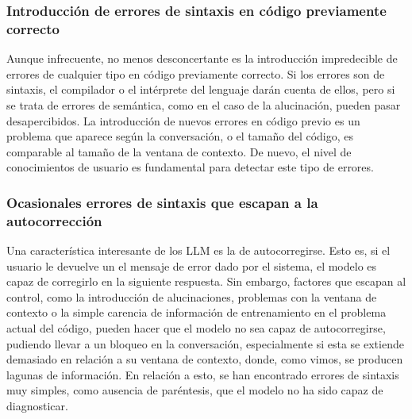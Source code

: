 \subsubsection{Introducción de errores de sintaxis en código previamente correcto}
Aunque infrecuente, no menos desconcertante es la introducción impredecible de errores de cualquier tipo en código previamente correcto. Si los errores son de sintaxis, el compilador o el intérprete del lenguaje darán cuenta de ellos, pero si se trata de errores de semántica, como en el caso de la alucinación, pueden pasar desapercibidos. La introducción de nuevos errores en código previo es un problema que aparece según la conversación, o el tamaño del código, es comparable al tamaño de la ventana de contexto. De nuevo, el nivel de conocimientos de usuario es fundamental para detectar este tipo de errores.


\subsubsection{Ocasionales errores de sintaxis que escapan a la autocorrección}
Una característica interesante de los LLM es la de autocorregirse. Esto es, si el usuario le devuelve un el mensaje de error dado por el sistema, el modelo es capaz de corregirlo en la siguiente respuesta. Sin embargo, factores que escapan al control, como la introducción de alucinaciones, problemas con la ventana de contexto o la simple carencia de información de entrenamiento en el problema actual del código, pueden hacer que el modelo no sea capaz de autocorregirse, pudiendo llevar a un bloqueo en la conversación, especialmente si esta se extiende demasiado en relación a su ventana de contexto, donde, como vimos, se producen lagunas de información. En relación a esto, se han encontrado errores de sintaxis muy simples, como ausencia de paréntesis, que el modelo no ha sido capaz de diagnosticar.


